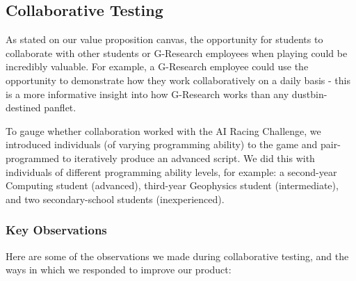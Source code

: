 \subsection{Collaborative Testing}

As stated on our value proposition canvas, the opportunity for students to collaborate with other students or G-Research employees when playing \project could be incredibly valuable. For example, a G-Research employee could use the opportunity to demonstrate how they work collaboratively on a daily basis - this is a more informative insight into how G-Research works than any dustbin-destined panflet.

To gauge whether collaboration worked with the AI Racing Challenge, we introduced individuals (of varying programming ability) to the game and pair-programmed to iteratively produce an advanced script. We did this with individuals of different programming ability levels, for example: a second-year Computing student (advanced), third-year Geophysics student (intermediate), and two secondary-school students (inexperienced). 

\subsubsection{Key Observations}

Here are some of the observations we made during collaborative testing, and the ways in which we responded to improve our product: \\

